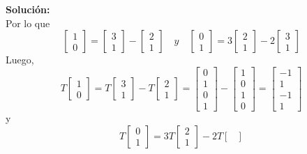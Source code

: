 \documentclass[12pt]{article}
\newenvironment{solucion}
{\begin{mdframed}[backgroundcolor=black!10]
		{\bf Solución:}\\
	}
	{
	\end{mdframed}
}
\newenvironment{preguntas}
{\begin{enumerate}\itemsep12pt
	}
	{
	\end{enumerate}
}
\begin{document}
\begin{preguntas}
\begin{solucion}
		Por lo que
		$$\begin{bmatrix}
		1 \\ 0
		\end{bmatrix} = \begin{bmatrix}
		3 \\ 1
		\end{bmatrix}- \begin{bmatrix}
		2 \\ 1
		\end{bmatrix}  \quad y \quad
		\begin{bmatrix}
		0 \\ 1
		\end{bmatrix} = 3 \begin{bmatrix}
		2 \\ 1
		\end{bmatrix} - 2 \begin{bmatrix}
		3 \\ 1
		\end{bmatrix}$$
		Luego,
		$$T\begin{bmatrix}
		1 \\ 0
		\end{bmatrix} = T\begin{bmatrix}
		3 \\ 1
		\end{bmatrix}- T\begin{bmatrix}
		2 \\ 1
		\end{bmatrix} = \begin{bmatrix}0 \\ 1 \\ 0 \\ 1\end{bmatrix} - \begin{bmatrix}1 \\0 \\ 1 \\ 0\end{bmatrix} = \begin{bmatrix}-1 \\ 1 \\ -1 \\ 1\end{bmatrix}$$
		y
		$$T\begin{bmatrix}
		0 \\ 1
		\end{bmatrix} = 3 T\begin{bmatrix}
		2 \\ 1
		\end{bmatrix} - 2 T\begin{bmatrix}

\end{bmatrix}$$
\end{solucion}
\end{preguntas}
\end{document}
